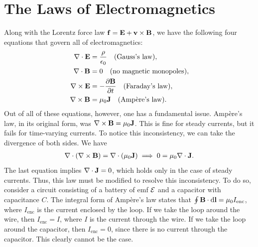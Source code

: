 \section{The Laws of Electromagnetics}
Along with the Lorentz force law $\mathbf{f} = \mathbf{E} + \mathbf{v} \times \mathbf{B}$, we have the following four equations that govern all of electromagnetics:
\begin{align}
\nabla \cdot \mathbf{E} &= \frac{\rho}{\epsilon_{0}} \quad \text{(Gauss's law)}, \notag \\
\nabla \cdot \mathbf{B} &= 0 \quad \text{(no magnetic monopoles)}, \notag \\
\nabla \times \mathbf{E} &= -\frac{\partial{\mathbf{B}}}{\partial{t}} \quad \text{(Faraday's law)}, \notag \\
\nabla \times \mathbf{B} &= \mu_{0} \mathbf{J} \quad \text{(Ampère's law)}. \notag
\end{align}
Out of all of these equations, however, one has a fundamental issue. Ampère's law, in its original form, was $\nabla \times \mathbf{B} = \mu_{0} \mathbf{J}$. This is fine for steady currents, but it fails for time-varying currents. To notice this inconsistency, we can take the divergence of both sides. We have
\begin{align}
\nabla \cdot (\nabla \times \mathbf{B}) = \nabla \cdot (\mu_{0} \mathbf{J}) \implies 0 = \mu_{0} \nabla \cdot \mathbf{J}.
\end{align}
The last equation implies $\nabla \cdot \mathbf{J} = 0$, which holds only in the case of steady currents. Thus, this law must be modified to resolve this inconsistency. To do so, consider a circuit consisting of a battery of emf $\mathcal{E}$ and a capacitor with capacitance $C$. The integral form of Ampère's law states that $\oint \mathbf{B} \cdot \mathrm{d}\mathbf{l} = \mu_{0} I_{\text{enc}}$, where $I_{\text{enc}}$ is the current enclosed by the loop. If we take the loop around the wire, then $I_{\text{enc}} = I$, where $I$ is the current through the wire. If we take the loop around the capacitor, then $I_{\text{enc}} = 0$, since there is no current through the capacitor. This clearly cannot be the case.

